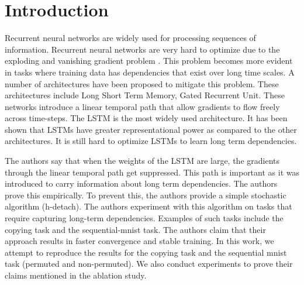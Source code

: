 
\vspace{-2em}

\section{Introduction}

Recurrent neural networks\supercite{Rumelhart:1988:LRB:65669.104451} are widely used for processing sequences of information. Recurrent neural networks are very hard to optimize due to the exploding and vanishing gradient problem \cite{pmid:18267787}. This problem becomes more evident in tasks where training data has dependencies that exist over long time scales. A number of architectures have been proposed to mitigate this problem. These architectures include Long Short Term Memory\supercite{Hochreiter:1997:LSM:1246443.1246450}, Gated Recurrent Unit\supercite{DBLP:journals/corr/ChungGCB14}. These networks introduce a linear temporal path that allow gradients to flow freely across time-steps. The LSTM is the most widely used architecture. It has been shown that LSTMs have greater representational power as compared to the other architectures\supercite{DBLP:journals/corr/abs-1805-04908}. It is still hard to optimize LSTMs to learn long term dependencies.

The authors say that when the weights of the LSTM are large, the gradients through the linear temporal path get suppressed. This path is important as it was introduced to carry information about long term dependencies. The authors prove this empirically. To prevent this, the authors provide a simple stochastic algorithm (h-detach). The authors experiment with this algorithm on tasks that require capturing long-term dependencies. Examples of such tasks include the copying task\supercite{pmid:18267787,DBLP:journals/corr/abs-1211-5063} and the sequential-mnist task\supercite{DBLP:journals/corr/LeJH15}. The authors claim that their approach results in faster convergence and stable training. In this work, we attempt to reproduce the results for the copying task and the sequential mnist task (permuted and non-permuted). We also conduct experiments to prove their claims mentioned in the ablation study.


